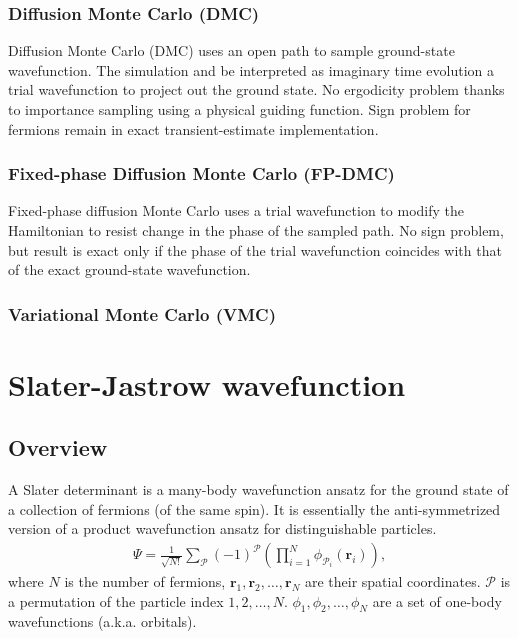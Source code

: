 \documentclass[draftthesis,fullpage]{uiucthesis}
\newcommand{\bs}{\boldsymbol}
\begin{document}
\subsection{Diffusion Monte Carlo (DMC)}
Diffusion Monte Carlo (DMC) uses an open path to sample ground-state wavefunction. The simulation and be interpreted as imaginary time evolution a trial wavefunction to project out the ground state. No ergodicity problem thanks to importance sampling using a physical guiding function. Sign problem for fermions remain in exact transient-estimate implementation.

\subsection{Fixed-phase Diffusion Monte Carlo (FP-DMC)}
Fixed-phase diffusion Monte Carlo uses a trial wavefunction to modify the Hamiltonian to resist change in the phase of the sampled path. No sign problem, but result is exact only if the phase of the trial wavefunction coincides with that of the exact ground-state wavefunction.

\subsection{Variational Monte Carlo (VMC)}


\chapter{Slater-Jastrow wavefunction}
\section{Overview}

A Slater determinant is a many-body wavefunction ansatz for the ground state of a collection of fermions (of the same spin). It is essentially the anti-symmetrized version of a product wavefunction ansatz for distinguishable particles.
\begin{align}
\Psi = \frac{1}{\sqrt{N!}}\sum\limits_{\mathcal{P}} (-1)^{\mathcal{P}} \left( \prod\limits_{i=1}^N \phi_{\mathcal{P}_i}(\bs{r}_i) \right),\label{eq:det}
\end{align}
where $N$ is the number of fermions, $\bs{r}_1, \bs{r}_2, \dots, \bs{r}_N$ are their spatial coordinates. $\mathcal{P}$ is a permutation of the particle index $1, 2, \dots, N$. $\phi_1, \phi_2, \dots, \phi_N$ are a set of one-body wavefunctions (a.k.a. orbitals).
\end{document}

